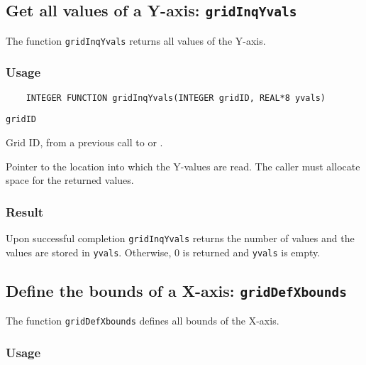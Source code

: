 \subsection{Get all values of a Y-axis: {\tt gridInqYvals}}
\label{gridInqYvals}

The function {\tt gridInqYvals} returns all values of the Y-axis.

\subsubsection*{Usage}

\begin{verbatim}
    INTEGER FUNCTION gridInqYvals(INTEGER gridID, REAL*8 yvals)
\end{verbatim}

\hspace*{4mm}\begin{minipage}[]{15cm}
\begin{deflist}{\tt gridID\ }
\item[{\tt gridID}]
Grid ID, from a previous call to {} or {}.
\item[{\tt yvals}]
Pointer to the location into which the Y-values are read.
                    The caller must allocate space for the returned values.

\end{deflist}
\end{minipage}

\subsubsection*{Result}

Upon successful completion {\tt gridInqYvals} returns the number of values and
the values are stored in {\tt yvals}.
Otherwise, 0 is returned and {\tt yvals} is empty.



\subsection{Define the bounds of a X-axis: {\tt gridDefXbounds}}
\label{gridDefXbounds}

The function {\tt gridDefXbounds} defines all bounds of the X-axis.

\subsubsection*{Usage}

